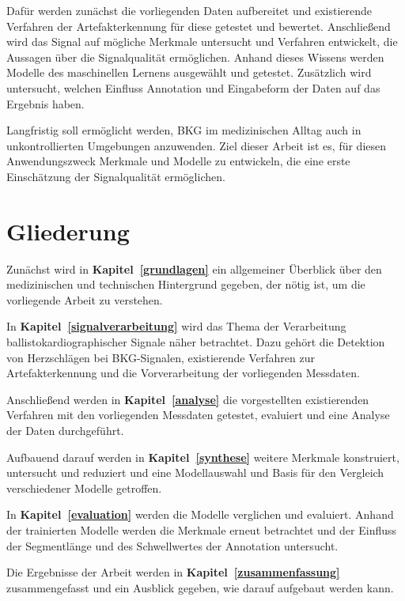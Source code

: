 Dafür werden zunächst die vorliegenden Daten aufbereitet und existierende Verfahren der Artefakterkennung für diese getestet und bewertet. Anschließend wird das Signal auf mögliche Merkmale untersucht und Verfahren entwickelt, die Aussagen über die Signalqualität ermöglichen. Anhand dieses Wissens werden Modelle des maschinellen Lernens ausgewählt und getestet. Zusätzlich wird untersucht, welchen Einfluss Annotation und Eingabeform der Daten auf das Ergebnis haben.

Langfristig soll ermöglicht werden, \acf{BKG} im medizinischen Alltag auch in unkontrollierten Umgebungen anzuwenden. Ziel dieser Arbeit ist es, für diesen Anwendungszweck Merkmale und Modelle zu entwickeln, die eine erste Einschätzung der Signalqualität ermöglichen.

\section{Gliederung}

Zunächst wird in \textbf{Kapitel~\ref{grundlagen}} ein allgemeiner Überblick über den medizinischen und technischen Hintergrund gegeben, der nötig ist, um die vorliegende Arbeit zu verstehen.

In \textbf{Kapitel~\ref{signalverarbeitung}} wird das Thema der Verarbeitung ballistokardiographischer Signale näher betrachtet. Dazu gehört die Detektion von Herzschlägen bei \ac{BKG}-Signalen, existierende Verfahren zur Artefakterkennung und die Vorverarbeitung der vorliegenden Messdaten.

Anschließend werden in \textbf{Kapitel~\ref{analyse}} die vorgestellten existierenden Verfahren mit den vorliegenden Messdaten getestet, evaluiert und eine Analyse der Daten durchgeführt.

Aufbauend darauf werden in \textbf{Kapitel~\ref{synthese}} weitere Merkmale konstruiert, untersucht und reduziert und eine Modellauswahl und Basis für den Vergleich verschiedener Modelle getroffen.

In \textbf{Kapitel~\ref{evaluation}} werden die Modelle verglichen und evaluiert. Anhand der trainierten Modelle werden die Merkmale erneut betrachtet und der Einfluss der Segmentlänge und des Schwellwertes der Annotation untersucht.

Die Ergebnisse der Arbeit werden in \textbf{Kapitel~\ref{zusammenfassung}} zusammengefasst und ein Ausblick gegeben, wie darauf aufgebaut werden kann.